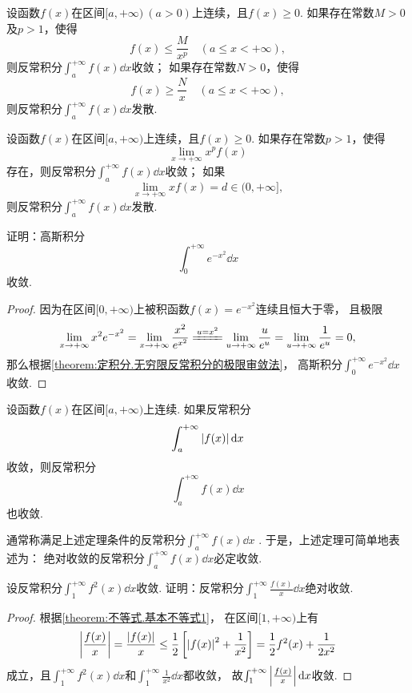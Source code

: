 \begin{theorem}[比较审敛法]\label{theorem:定积分.无穷限反常积分的比较审敛法}
设函数\(f(x)\)在区间\([a,+\infty)\ (a>0)\)上连续，且\(f(x) \geq 0\).
如果存在常数\(M>0\)及\(p>1\)，使得\[
f(x) \leq \frac{M}{x^p} \quad (a \leq x < +\infty),
\]则反常积分\(\int_a^{+\infty} f(x) \dd{x}\)收敛；
如果存在常数\(N>0\)，使得\[
f(x) \geq \frac{N}{x} \quad (a \leq x < +\infty),
\]则反常积分\(\int_a^{+\infty} f(x) \dd{x}\)发散.
\end{theorem}

\begin{theorem}[极限审敛法]\label{theorem:定积分.无穷限反常积分的极限审敛法}
设函数\(f(x)\)在区间\([a,+\infty)\)上连续，且\(f(x) \geq 0\).
如果存在常数\(p > 1\)，使得\[
\lim\limits_{x \to +\infty} x^p f(x)
\]存在，则反常积分\(\int_a^{+\infty} f(x) \dd{x}\)收敛；
如果\[
\lim\limits_{x \to +\infty} x f(x) = d \in (0,+\infty],
\]则反常积分\(\int_a^{+\infty} f(x) \dd{x}\)发散.
\end{theorem}

\begin{example}\label{example:定积分.高斯积分的收敛性}
证明：高斯积分\[
\int_0^{+\infty} e^{-x^2} \dd{x}
\]收敛.
\begin{proof}
因为在区间\([0,+\infty)\)上被积函数\(f(x) = e^{-x^2}\)连续且恒大于零，
且极限\[
\lim\limits_{x\to+\infty} x^2 e^{-x^2}
= \lim\limits_{x\to+\infty} \frac{x^2}{e^{x^2}}
\xlongequal{u=x^2} \lim\limits_{u\to+\infty} \frac{u}{e^u}
= \lim\limits_{u\to+\infty} \frac{1}{e^u}
= 0,
\]
那么根据\cref{theorem:定积分.无穷限反常积分的极限审敛法}，
高斯积分\(\int_0^{+\infty} e^{-x^2} \dd{x}\)收敛.
\end{proof}
\end{example}

\begin{theorem}\label{theorem:定积分.绝对收敛的无穷限反常积分必收敛}
设函数\(f(x)\)在区间\([a,+\infty)\)上连续.
如果反常积分\[
\int_a^{+\infty} \abs{f(x)} \dd{x}
\]收敛，则反常积分\[
\int_a^{+\infty} f(x) \dd{x}
\]也收敛.
\end{theorem}
通常称满足上述定理条件的反常积分\(\int_a^{+\infty} f(x) \dd{x}\) .
于是，上述定理可简单地表述为：
绝对收敛的反常积分\(\int_a^{+\infty} f(x) \dd{x}\)必定收敛.

\begin{example}
设反常积分\(\int_1^{+\infty} f^2(x) \dd{x}\)收敛.
证明：反常积分\(\int_1^{+\infty} \frac{f(x)}{x} \dd{x}\)绝对收敛.
\begin{proof}
根据\cref{theorem:不等式.基本不等式1}，
在区间\([1,+\infty)\)上有\[
\abs{\frac{f(x)}{x}}
= \frac{\abs{f(x)}}{x}
\leq \frac{1}{2} \left[
	\abs{f(x)}^2 + \frac{1}{x^2}
\right]
= \frac{1}{2} f^2(x) + \frac{1}{2x^2}
\]成立，且\(\int_1^{+\infty} f^2(x) \dd{x}\)和\(\int_1^{+\infty} \frac{1}{x^2} \dd{x}\)都收敛，
故\(\int_1^{+\infty} \abs{\frac{f(x)}{x}} \dd{x}\)收敛.
\end{proof}
\end{example}

